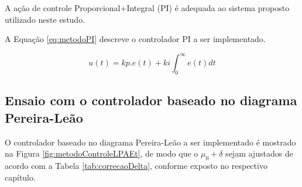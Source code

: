 A ação de controle Proporcional+Integral (PI) é adequada ao sistema
proposto utilizado neste estudo.

A Equação \ref{eq:metodoPI} descreve o controlador PI a ser implementado.

\begin{equation}
  u(t) = kp.e(t) + ki \int_{0}^{\infty} e(t) dt
\label{eq:metodoPI}  
\end{equation}


\subsection{ Ensaio com o controlador baseado no diagrama Pereira-Leão}

O controlador baseado no diagrama Pereira-Leão a ser implementado é mostrado na Figura 
\ref{fig:metodoControleLPAEt}, de modo que o $\mu_0 + \delta$ sejam
ajustados de acordo com a Tabela \ref{tab:correcaoDelta}, conforme
exposto no respectivo capítulo.


